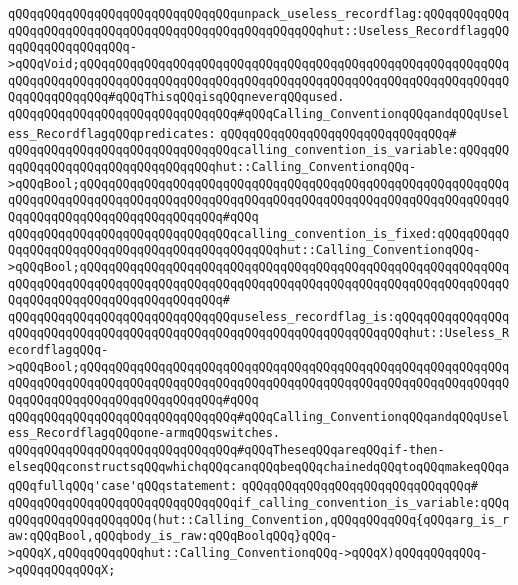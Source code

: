 \verb|qQQqqQQqqQQqqQQqqQQqqQQqqQQqqQQqunpack_useless_recordflag:qQQqqQQqqQQqqQQqqQQqqQQqqQQqqQQqqQQqqQQqqQQqqQQqqQQqqQQqhut::Useless_RecordflagqQQqqQQqqQQqqQQqqQQq->qQQqVoid;qQQqqQQqqQQqqQQqqQQqqQQqqQQqqQQqqQQqqQQqqQQqqQQqqQQqqQQqqQQqqQQqqQQqqQQqqQQqqQQqqQQqqQQqqQQqqQQqqQQqqQQqqQQqqQQqqQQqqQQqqQQqqQQqqQQqqQQqqQQqqQQq#qQQqThisqQQqisqQQqneverqQQqused.|\newline
\newline
\verb|qQQqqQQqqQQqqQQqqQQqqQQqqQQqqQQq#qQQqCalling_ConventionqQQqandqQQqUseless_RecordflagqQQqpredicates:|\newline
\verb|qQQqqQQqqQQqqQQqqQQqqQQqqQQqqQQq#|\newline
\verb|qQQqqQQqqQQqqQQqqQQqqQQqqQQqqQQqcalling_convention_is_variable:qQQqqQQqqQQqqQQqqQQqqQQqqQQqqQQqqQQqhut::Calling_ConventionqQQq->qQQqBool;qQQqqQQqqQQqqQQqqQQqqQQqqQQqqQQqqQQqqQQqqQQqqQQqqQQqqQQqqQQqqQQqqQQqqQQqqQQqqQQqqQQqqQQqqQQqqQQqqQQqqQQqqQQqqQQqqQQqqQQqqQQqqQQqqQQqqQQqqQQqqQQqqQQqqQQqqQQqqQQq#qQQq|\newline
\verb|qQQqqQQqqQQqqQQqqQQqqQQqqQQqqQQqcalling_convention_is_fixed:qQQqqQQqqQQqqQQqqQQqqQQqqQQqqQQqqQQqqQQqqQQqqQQqhut::Calling_ConventionqQQq->qQQqBool;qQQqqQQqqQQqqQQqqQQqqQQqqQQqqQQqqQQqqQQqqQQqqQQqqQQqqQQqqQQqqQQqqQQqqQQqqQQqqQQqqQQqqQQqqQQqqQQqqQQqqQQqqQQqqQQqqQQqqQQqqQQqqQQqqQQqqQQqqQQqqQQqqQQqqQQqqQQqqQQq#|\newline
\verb|qQQqqQQqqQQqqQQqqQQqqQQqqQQqqQQquseless_recordflag_is:qQQqqQQqqQQqqQQqqQQqqQQqqQQqqQQqqQQqqQQqqQQqqQQqqQQqqQQqqQQqqQQqqQQqqQQqhut::Useless_RecordflagqQQq->qQQqBool;qQQqqQQqqQQqqQQqqQQqqQQqqQQqqQQqqQQqqQQqqQQqqQQqqQQqqQQqqQQqqQQqqQQqqQQqqQQqqQQqqQQqqQQqqQQqqQQqqQQqqQQqqQQqqQQqqQQqqQQqqQQqqQQqqQQqqQQqqQQqqQQqqQQqqQQqqQQqqQQq#qQQq|\newline
\newline
\verb|qQQqqQQqqQQqqQQqqQQqqQQqqQQqqQQq#qQQqCalling_ConventionqQQqandqQQqUseless_RecordflagqQQqone-armqQQqswitches.|\newline
\verb|qQQqqQQqqQQqqQQqqQQqqQQqqQQqqQQq#qQQqTheseqQQqareqQQqif-then-elseqQQqconstructsqQQqwhichqQQqcanqQQqbeqQQqchainedqQQqtoqQQqmakeqQQqaqQQqfullqQQq'case'qQQqstatement:|\newline
\verb|qQQqqQQqqQQqqQQqqQQqqQQqqQQqqQQq#|\newline
\verb|qQQqqQQqqQQqqQQqqQQqqQQqqQQqqQQqif_calling_convention_is_variable:qQQqqQQqqQQqqQQqqQQqqQQq(hut::Calling_Convention,qQQqqQQqqQQq{qQQqarg_is_raw:qQQqBool,qQQqbody_is_raw:qQQqBoolqQQq}qQQq->qQQqX,qQQqqQQqqQQqhut::Calling_ConventionqQQq->qQQqX)qQQqqQQqqQQq->qQQqqQQqqQQqX;|\newline
